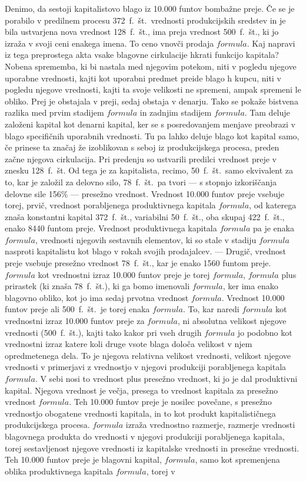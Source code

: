 \documentclass[a5paper]{scrbook}
\begin{document}
Denimo, da sestoji kapitalistovo blago iz 10.000 funtov bombažne preje. Če se je porabilo v predilnem procesu 372~f.~št.\ vrednosti produkcijskih sredstev in je bila ustvarjena nova vrednost 128~f.~št., ima preja vrednost 500~f.~št., ki jo izraža v svoji ceni enakega imena. To ceno vnovči prodaja \( formula \). Kaj napravi iz tega preprostega akta vsake blagovne cirkulacije hkrati funkcijo kapitala? Nobena sprememba, ki bi nastala med njegovim potekom, niti v pogledu njegove uporabne vrednosti, kajti kot uporabni predmet preide blago h kupcu, niti v pogledu njegove vrednosti, kajti ta svoje velikosti ne spremeni, ampak spremeni le obliko. Prej je obstajala v preji, sedaj obstaja v denarju. Tako se pokaže bistvena razlika med prvim stadijem \( formula \) in zadnjim stadijem \( formula \). Tam deluje založeni kapital kot denarni kapital, ker se s posredovanjem menjave preobrazi v blago specifičnih uporabnih vrednosti. Tu pa lahko deluje blago kot kapital samo, če prinese ta značaj že izoblikovan s seboj iz produkcijskega procesa, preden začne njegova cirkulacija. Pri predenju so ustvarili predilci vrednost preje v znesku 128~f.~št. Od tega je za kapitalista, recimo, 50~f.~št.\ samo ekvivalent za to, kar je založil za delovno silo, 78~f.~št.\ pa tvori --- s stopnjo izkoriščanja delovne sile 156\% --- presežno vrednost. Vrednost 10.000 funtov preje vsebuje torej, prvič, vrednost porabljenega produktivnega kapitala \( formula \), od katerega znaša konstantni kapital 372~f.~št., variabilni 50~f.~št., oba skupaj 422~f.~št., enako 8440 funtom preje. Vrednost produktivnega kapitala \( formula \) pa je enaka \( formula \), vrednosti njegovih sestavnih elementov, ki so stale v stadiju \( formula \) nasproti kapitalistu kot blago v rokah svojih prodajalcev. --- Drugič, vrednost preje vsebuje presežno vrednost 78~f.~št., kar je enako 1560 funtom preje. \( formula \) kot vrednostni izraz 10.000 funtov preje je torej \( formula \), \( formula \) plus prirastek (ki znaša 78~f.~št.), ki ga bomo imenovali \( formula \), ker ima enako blagovno obliko, kot jo ima sedaj prvotna vrednost \( formula \). Vrednost 10.000 funtov preje ali 500~f.~št.\ je torej enaka \( formula \). To, kar naredi \( formula \) kot vrednostni izraz 10.000 funtov preje za \( formula \), ni absolutna velikost njegove vrednosti (500~f.~št.), kajti tako kakor pri vseh drugih \( formula \) jo podobno kot vrednostni izraz katere koli druge vsote blaga določa velikost v njem opredmetenega dela. To je njegova relativna velikost vrednosti, velikost njegove vrednosti v primerjavi z vrednostjo v njegovi produkciji porabljenega kapitala \( formula \). V sebi nosi to vrednost plus presežno vrednost, ki jo je dal produktivni kapital. Njegova vrednost je večja, presega to vrednost kapitala za presežno vrednost \( formula \). Teh 10.000 funtov preje je nosilec povečane, s presežno vrednostjo obogatene vrednosti kapitala, in to kot produkt kapitalističnega produkcijskega procesa. \( formula \) izraža vrednostno razmerje, razmerje vrednosti blagovnega produkta do vrednosti v njegovi produkciji porabljenega kapitala, torej sestavljenost njegove vrednosti iz kapitalske vrednosti in presežne vrednosti. Teh 10.000 funtov preje je blagovni kapital, \( formula \), samo kot spremenjena oblika produktivnega kapitala \( formula \), torej v 
\end{document}
